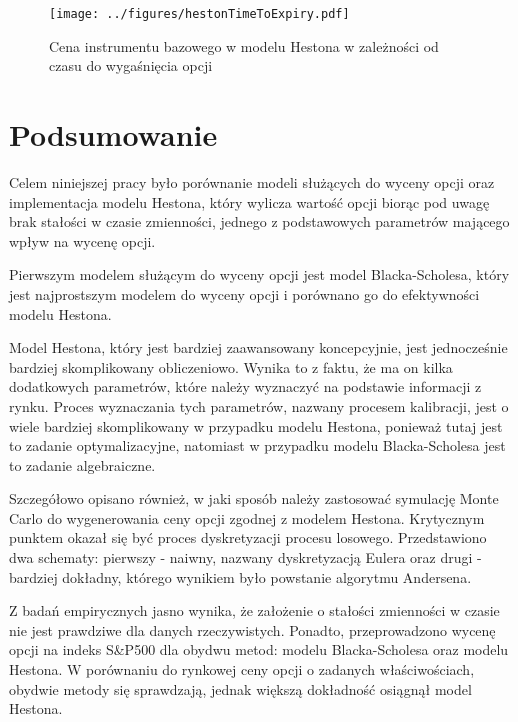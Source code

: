 \documentclass{pracamgr}
\begin{document}
\begin{figure}
  \texttt{[image: ../figures/hestonTimeToExpiry.pdf]}
  \caption{Cena instrumentu bazowego w modelu Hestona w zależności od czasu do wygaśnięcia opcji}
  \label{fig:hestonTimeToExpiry}
\end{figure}


\cleardoublepage
{}
\chapter*{Podsumowanie}\label{r:ending}
 

Celem niniejszej pracy było porównanie modeli służących do wyceny
opcji oraz implementacja modelu Hestona, który wylicza wartość opcji biorąc
pod uwagę brak stałości w czasie zmienności, jednego z podstawowych parametrów
mającego wpływ na wycenę opcji. 

Pierwszym modelem służącym do wyceny opcji jest model Blacka-Scholesa, który jest
najprostszym modelem do wyceny opcji i porównano go do efektywności modelu 
Hestona. 

Model Hestona, który jest bardziej zaawansowany koncepcyjnie, jest jednocześnie 
bardziej skomplikowany obliczeniowo. Wynika to z faktu, że ma on kilka dodatkowych
parametrów, które należy wyznaczyć na podstawie informacji z rynku. Proces wyznaczania tych 
parametrów, nazwany procesem kalibracji, jest o wiele bardziej skomplikowany w przypadku 
modelu Hestona, ponieważ tutaj jest to zadanie optymalizacyjne, natomiast w przypadku modelu
Blacka-Scholesa jest to zadanie algebraiczne.

Szczegółowo opisano również, w jaki sposób należy zastosować symulację Monte Carlo do 
wygenerowania ceny opcji zgodnej z modelem Hestona. Krytycznym punktem okazał się być
proces dyskretyzacji procesu losowego. Przedstawiono dwa schematy: pierwszy - naiwny, nazwany
dyskretyzacją Eulera oraz drugi - bardziej dokładny, którego wynikiem było powstanie 
algorytmu Andersena. 

Z badań empirycznych jasno wynika, że założenie o stałości zmienności w czasie nie jest 
prawdziwe dla danych rzeczywistych. Ponadto, przeprowadzono wycenę opcji na indeks 
S\&P500 dla obydwu metod: modelu Blacka-Scholesa oraz modelu Hestona. 
W porównaniu do rynkowej ceny opcji o zadanych właściwościach, obydwie metody się 
sprawdzają, jednak większą dokładność osiągnął model Hestona.
\end{document}
